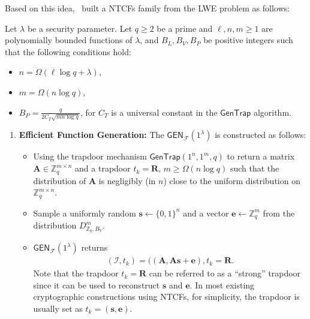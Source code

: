 Based on this idea,~\cite{Brakerski18_Interactiveproofofquantumness} built a NTCFs family from the LWE problem as follows:

\begin{defn}
    Let $\lambda$ be a security parameter. Let $q\geq 2$ be a prime and $\ell,n,m\geq 1$ are polynomially bounded functions of $\lambda$, and $B_L,B_V, B_P$ be positive integers such that the following conditions hold:
    \begin{itemize}
        \item $n=\Omega(\ell\log q +\lambda)$,
        \item $m=\Omega(n\log q)$,
        \item $B_P = \displaystyle{\frac{q}{2C_T\sqrt{mn\log q}}}$, for $C_T$ is a universal constant in the $\mathsf{GenTrap}$ algorithm.
    \end{itemize}
\begin{enumerate}
    \item \textbf{Efficient Function Generation:} The $\mathsf{GEN}_{\mathcal{F}}(1^{\lambda})$ is constructed as follows:
    \begin{itemize}
        \item Using the trapdoor mechanism  $\mathsf{GenTrap}(1^n,1^m,q)$ to return a matrix $\mathbf{A}\in\mathbb{Z}^{m\times n}_q$ and a trapdoor $t_{k}=\mathbf{R}$, $m\geq \Omega (n\log q)$ such that the distribution of $\mathbf{A}$ is negligibly (in $n$) close to the uniform distribution on $\mathbb{Z}^{m\times n}_q$.
        \item Sample a uniformly random $\mathbf{s}\gets \{0,1\}^{n}$ and a vector $\mathbf{e}\gets \mathbb{Z}^m_q$ from the distribution $D^m_{\mathbb{Z}_q,B_V}$.
        \item $\mathsf{GEN}_{\mathcal{F}}(1^{\lambda})$ returns 
        \begin{align}
            (\mathcal{I},t_{k})=((\mathbf{A},\mathbf{A}\mathbf{s}+\mathbf{e}),t_{k}=\mathbf{R}.
        \end{align}
    Note that the trapdoor $t_{k}=\mathbf{R}$ can be referred to as a ``strong'' trapdoor since it can be used to reconstruct $\mathbf{s}$ and $\mathbf{e}$. In most existing cryptographic constructions using NTCFs, for simplicity, the trapdoor is usually set as $t_{k}=(\mathbf{s},\mathbf{e})$.

\end{itemize}
\end{enumerate}
\end{defn}
